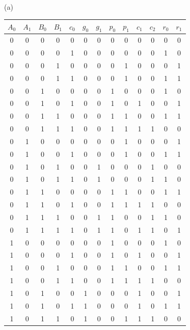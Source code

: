 \documentclass[a4paper]{article}
\begin{document}
\begin{answer}[Question 1]
    (a)
    \begin{center}
        \begin{tabular}{ |c|c|c|c|c|c|c|c|c|c|c|c|c| }
            \hline
            $A_0$&$A_1$&$B_0$&$B_1$&$c_0$&$g_0$&$g_1$&$p_0$&$p_1$&$c_1$&$c_2$&$r_0$&$r_1$\\
            \hline
            0&0&0&0&0&0&0&0&0&0&0&0&0\\
            \hline
            0&0&0&0&1&0&0&0&0&0&0&1&0\\
            \hline
            0&0&0&1&0&0&0&0&1&0&0&0&1\\
            \hline
            0&0&0&1&1&0&0&0&1&0&0&1&1\\
            \hline
            0&0&1&0&0&0&0&1&0&0&0&1&0\\
            \hline
            0&0&1&0&1&0&0&1&0&1&0&0&1\\
            \hline
            0&0&1&1&0&0&0&1&1&0&0&1&1\\
            \hline
            0&0&1&1&1&0&0&1&1&1&1&0&0\\
            \hline
            0&1&0&0&0&0&0&0&1&0&0&0&1\\
            \hline
            0&1&0&0&1&0&0&0&1&0&0&1&1\\
            \hline
            0&1&0&1&0&0&1&0&0&0&1&0&0\\
            \hline
            0&1&0&1&1&0&1&0&0&0&1&1&0\\
            \hline
            0&1&1&0&0&0&0&1&1&0&0&1&1\\
            \hline
            0&1&1&0&1&0&0&1&1&1&1&0&0\\
            \hline
            0&1&1&1&0&0&1&1&0&0&1&1&0\\
            \hline
            0&1&1&1&1&0&1&1&0&1&1&0&1\\
            \hline
            1&0&0&0&0&0&0&1&0&0&0&1&0\\
            \hline
            1&0&0&0&1&0&0&1&0&1&0&0&1\\
            \hline
            1&0&0&1&0&0&0&1&1&0&0&1&1\\
            \hline
            1&0&0&1&1&0&0&1&1&1&1&0&0\\
            \hline
            1&0&1&0&0&1&0&0&0&1&0&0&1\\
            \hline
            1&0&1&0&1&1&0&0&0&1&0&1&1\\
            \hline
            1&0&1&1&0&1&0&0&1&1&1&0&0\\

\end{tabular}
\end{center}
\end{answer}
\end{document}
